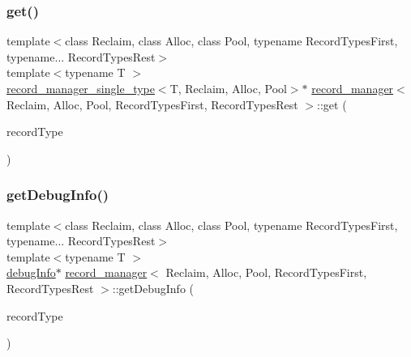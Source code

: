 \subsubsection{\texorpdfstring{get()}{get()}}
{\footnotesize\ttfamily template$<$class Reclaim, class Alloc, class Pool, typename Record\+Types\+First, typename... Record\+Types\+Rest$>$ \\
template$<$typename T $>$ \\
\hyperlink{classrecord__manager__single__type}{record\+\_\+manager\+\_\+single\+\_\+type}$<$T, Reclaim, Alloc, Pool$>$$\ast$ \hyperlink{classrecord__manager}{record\+\_\+manager}$<$ Reclaim, Alloc, Pool, Record\+Types\+First, Record\+Types\+Rest $>$\+::get (\begin{DoxyParamCaption}\item[{T $\ast$const}]{record\+Type }\end{DoxyParamCaption})\hspace{0.3cm}{\ttfamily [inline]}}

\mbox{\label{classrecord__manager_a642b6e4ad8a8267d0258489bc7d21a5b}} 
\subsubsection{\texorpdfstring{get\+Debug\+Info()}{getDebugInfo()}}
{\footnotesize\ttfamily template$<$class Reclaim, class Alloc, class Pool, typename Record\+Types\+First, typename... Record\+Types\+Rest$>$ \\
template$<$typename T $>$ \\
\hyperlink{classdebugInfo}{debug\+Info}$\ast$ \hyperlink{classrecord__manager}{record\+\_\+manager}$<$ Reclaim, Alloc, Pool, Record\+Types\+First, Record\+Types\+Rest $>$\+::get\+Debug\+Info (\begin{DoxyParamCaption}\item[{T $\ast$const}]{record\+Type }\end{DoxyParamCaption})\hspace{0.3cm}{\ttfamily [inline]}}

\mbox{\label{classrecord__manager_a6c5b2928e4b2e9c9e88d2dc99a6bd609}} 
